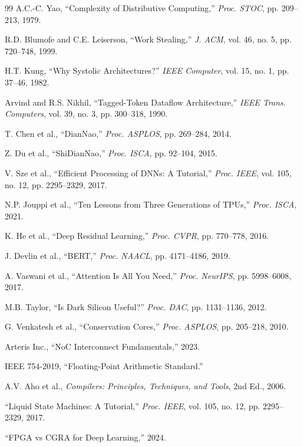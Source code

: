 ﻿\documentclass[review,3p,twocolumn]{elsarticle}
\begin{document}
\begin{thebibliography}{99}
 A.C.-C. Yao, ``Complexity of Distributive Computing,'' \emph{Proc. STOC}, pp. 209--213, 1979.

 R.D. Blumofe and C.E. Leiserson, ``Work Stealing,'' \emph{J. ACM}, vol. 46, no. 5, pp. 720--748, 1999.

 H.T. Kung, ``Why Systolic Architectures?'' \emph{IEEE Computer}, vol. 15, no. 1, pp. 37--46, 1982.

 Arvind and R.S. Nikhil, ``Tagged-Token Dataflow Architecture,'' \emph{IEEE Trans. Computers}, vol. 39, no. 3, pp. 300--318, 1990.

 T. Chen et al., ``DianNao,'' \emph{Proc. ASPLOS}, pp. 269--284, 2014.

 Z. Du et al., ``ShiDianNao,'' \emph{Proc. ISCA}, pp. 92--104, 2015.

 V. Sze et al., ``Efficient Processing of DNNs: A Tutorial,'' \emph{Proc. IEEE}, vol. 105, no. 12, pp. 2295--2329, 2017.

 N.P. Jouppi et al., ``Ten Lessons from Three Generations of TPUs,'' \emph{Proc. ISCA}, 2021.

 K. He et al., ``Deep Residual Learning,'' \emph{Proc. CVPR}, pp. 770--778, 2016.

 J. Devlin et al., ``BERT,'' \emph{Proc. NAACL}, pp. 4171--4186, 2019.

 A. Vaswani et al., ``Attention Is All You Need,'' \emph{Proc. NeurIPS}, pp. 5998--6008, 2017.

 M.B. Taylor, ``Is Dark Silicon Useful?'' \emph{Proc. DAC}, pp. 1131--1136, 2012.

 G. Venkatesh et al., ``Conservation Cores,'' \emph{Proc. ASPLOS}, pp. 205--218, 2010.

 Arteris Inc., ``NoC Interconnect Fundamentals,'' 2023.

 IEEE 754-2019, ``Floating-Point Arithmetic Standard.''

 A.V. Aho et al., \emph{Compilers: Principles, Techniques, and Tools}, 2nd Ed., 2006.

 ``Liquid State Machines: A Tutorial,'' \emph{Proc. IEEE}, vol. 105, no. 12, pp. 2295--2329, 2017.

 ``FPGA vs CGRA for Deep Learning,'' 2024.


\end{thebibliography}
\end{document}
